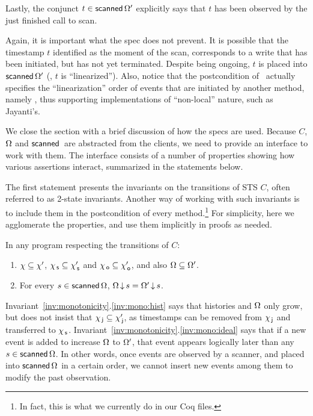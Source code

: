 Lastly, the conjunct $t \in \mathsf{scanned}\,\Omega'$ explicitly says
that $t$ has been observed by the just finished call to scan.

Again, it is important what the spec does not prevent. It is possible
that the timestamp $t$ identified as the moment of the scan,
corresponds to a write that has been initiated, but has not yet terminated.
Despite being ongoing, $t$ is placed into $\mathsf{scanned}\,\Omega'$
(\ie, $t$ is ``linearized''). Also, notice that the postcondition of
\jyscan\ actually specifies the ``linearization'' order of events that
are initiated by another method, namely \jywrite, thus supporting
implementations of ``non-local'' nature, such as Jayanti's.

We close the section with a brief discussion of how the specs are
used. Because $C$, $\Omega$ and $\scanned$ are abstracted from
the clients, we need to provide an interface to work with them. The
interface consists of a number of properties showing how various
assertions interact, summarized in the statements below.

The first statement presents the invariants on the transitions of STS
$C$, often referred to as 2-state invariants.
%
Another way of working with such invariants is to include them in the
postcondition of every method.\footnote{In fact, this is what we
  currently do in our Coq files.} For simplicity, here we agglomerate
the properties, and use them implicitly in proofs as needed.
%
\begin{invariant}\label{inv:monotonicity}
In any program respecting the transitions of $C$: 
\begin{enumerate}
\item\label{inv:mono:hist} $\chi \subseteq \chi'$, $\chi_{\, \mathsf{s}} \subseteq
  \chi_{\, \mathsf{s}}'$ and $\chi_{\, \mathsf{o}} \subseteq \chi_{\, \mathsf{o}}'$, and also $\Omega
  \subseteq \Omega'$.
\item\label{inv:mono:ideal} For every $s \in \mathsf{scanned}\,\Omega$,
  $\Omega\,{\downarrow}\,s = \Omega'\,{\downarrow}\,s$.
\end{enumerate}
\end{invariant}

Invariant~\ref{inv:monotonicity}.\ref{inv:mono:hist} says that
histories and $\Omega$ only grow, but does not insist that
$\chi_{\, \mathsf{j}} \subseteq \chi_{\, \mathsf{j}}'$, as timestamps can be removed from $\chi_{\, \mathsf{j}}$
and transferred to $\chi_{\, \mathsf{s}}$.
%
Invariant~\ref{inv:monotonicity}.\ref{inv:mono:ideal} says that if a
new event is added to increase $\Omega$ to $\Omega'$, that
event appears logically later than any $s \in
\mathsf{scanned}\,\Omega$. In other words, once events are observed by a
scanner, and placed into $\mathsf{scanned}\,\Omega$ in a certain order,
we cannot insert new events among them to modify the past observation.

